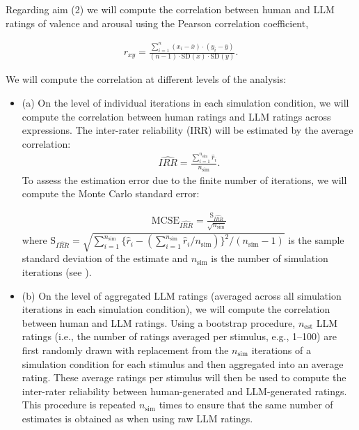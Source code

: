 \documentclass[12pt]{article}
\begin{document}
	\begin{examplebox}
		Regarding aim (2) we will compute the correlation between human and LLM ratings of valence and arousal using the Pearson correlation coefficient,
		
		\begin{align}
			r_{xy} = \frac{\sum_{i=1}^n (x_i - \bar{x})\cdot(y_i - \bar{y})}{(n-1) \cdot \text{SD}(x) \cdot \text{SD}(y)}.
		\end{align}
		
		We will compute the correlation at different levels of the analysis:
		
		\begin{itemize}
			\item (a) On the level of individual iterations in each simulation condition, we will compute the correlation between human ratings and LLM ratings across expressions. The inter-rater reliability (IRR) will be estimated by the average correlation:
			\begin{align}
				\widehat{IRR} = \frac{\sum_{i=1}^{n_{\text{sim}}}\hat{r}_i}{n_{\text{sim}}}.
			\end{align}
			To assess the estimation error due to the finite number of iterations, we will compute the Monte Carlo standard error:
			
			\begin{align}
				\text{MCSE}_{\widehat{IRR}} = \frac{\text{S}_{\widehat{IRR}}}{\sqrt{n_{\text{sim}}}}
			\end{align}
			where $\text{S}_{\widehat{\textit{IRR}}} = \sqrt{\sum_{i=1}^{n_{\text{sim}}}\{ \hat{r}_i - \left( \sum_{i=1}^{n_{\text{sim}}} \hat{r}_i / n_{\text{sim}} \right) \} ^2 / (n_{\text{sim}} - 1)}$ is the sample standard deviation of the estimate and $n_{\text{sim}}$ is the number of simulation iterations (see \cite{siepeSimulationStudiesMethodological2024}).
			\item (b) On the level of aggregated LLM ratings (averaged across all simulation iterations in each simulation condition), we will compute the correlation between human and LLM ratings. Using a bootstrap procedure, $n_{\text{est}}$  LLM ratings (i.e., the number of ratings averaged per stimulus, e.g., 1--100) are first randomly drawn with replacement from the $n_{\text{sim}}$ iterations of a simulation condition for each stimulus and then aggregated into an average rating. These average ratings per stimulus will then be used to compute the inter-rater reliability between human-generated and LLM-generated ratings. This procedure is repeated $n_{\text{sim}}$ times to ensure that the same number of estimates is obtained as when using raw LLM ratings. 
		\end{itemize}
	\end{examplebox} 
	
\end{document}
